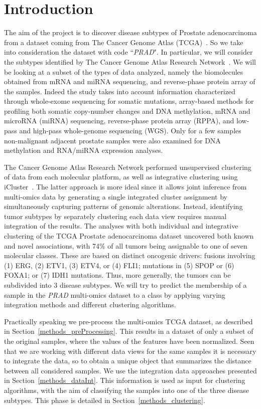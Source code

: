 \chapter{Introduction}\label{introduction}
The aim of the project is to discover disease subtypes of Prostate adenocarcinoma from a dataset coming from The Cancer Genome Atlas (TCGA)~\cite{hutter2018TCGA}. So we take into consideration the dataset with code ``\textit{PRAD}". In particular, we will consider the subtypes identified by The Cancer Genome Atlas Research Network~\cite{abeshouse2015molecularPRAD}. We will be looking at a subset of the types of data analyzed, namely the biomolecules obtained from mRNA and miRNA sequencing, and reverse-phase protein array of the samples. Indeed the study takes into account information characterized through whole-exome sequencing for somatic mutations, array-based methods for profiling both somatic copy-number changes and DNA methylation, mRNA and microRNA (miRNA) sequencing, reverse-phase protein array (RPPA), and low-pass and high-pass whole-genome sequencing (WGS). Only for a few samples non-malignant adjacent prostate samples were also examined for DNA methylation and RNA/miRNA expression analyses.

The Cancer Genome Atlas Research Network performed unsupervised clustering of data from each molecular platform, as well as integrative clustering using iCluster~\cite{shen2009integrative}. The latter approach is more ideal since it allows joint inference from multi-omics data by generating a single integrated cluster assignment by simultaneously capturing patterns of genomic alterations. Instead, identifying tumor subtypes by separately clustering each data view requires manual integration of the results. The analyses with both individual and integrative clustering of the TCGA Prostate adenocarcinoma dataset uncovered both known and novel associations, with 74\% of all tumors being assignable to one of seven molecular classes. These are based on distinct oncogenic drivers: fusions involving (1) ERG, (2) ETV1, (3) ETV4, or (4) FLI1; mutations in (5) SPOP
or (6) FOXA1; or (7) IDH1 mutations. Thus, more generally, the tumors can be subdivided into 3 disease subtypes. We will try to predict the membership of a sample in the \textit{PRAD} multi-omics dataset to a class by applying varying integration methods and different clustering algorithms.\newline

Practically speaking we pre-process the multi-omics TCGA dataset, as described in Section~\ref{methods_preProcessing}. This results in a dataset of only a subset of the original samples, where the values of the features have been normalized. Seen that we are working with different data views for the same samples it is necessary to integrate the data, so to obtain a unique object that summarizes the distance between all considered samples. We use the integration data approaches presented in Section~\ref{methods_dataInt}. This information is used as input for clustering algorithms, with the aim of classifying the samples into one of the three disease subtypes. This phase is detailed in Section~\ref{methods_clustering}.

